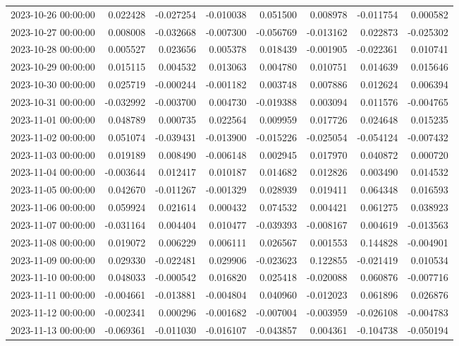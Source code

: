 \begin{tabular}{lrrrrrrr}
2023-10-26 00:00:00 & 0.022428 & -0.027254 & -0.010038 & 0.051500 & 0.008978 & -0.011754 & 0.000582 \\
2023-10-27 00:00:00 & 0.008008 & -0.032668 & -0.007300 & -0.056769 & -0.013162 & 0.022873 & -0.025302 \\
2023-10-28 00:00:00 & 0.005527 & 0.023656 & 0.005378 & 0.018439 & -0.001905 & -0.022361 & 0.010741 \\
2023-10-29 00:00:00 & 0.015115 & 0.004532 & 0.013063 & 0.004780 & 0.010751 & 0.014639 & 0.015646 \\
2023-10-30 00:00:00 & 0.025719 & -0.000244 & -0.001182 & 0.003748 & 0.007886 & 0.012624 & 0.006394 \\
2023-10-31 00:00:00 & -0.032992 & -0.003700 & 0.004730 & -0.019388 & 0.003094 & 0.011576 & -0.004765 \\
2023-11-01 00:00:00 & 0.048789 & 0.000735 & 0.022564 & 0.009959 & 0.017726 & 0.024648 & 0.015235 \\
2023-11-02 00:00:00 & 0.051074 & -0.039431 & -0.013900 & -0.015226 & -0.025054 & -0.054124 & -0.007432 \\
2023-11-03 00:00:00 & 0.019189 & 0.008490 & -0.006148 & 0.002945 & 0.017970 & 0.040872 & 0.000720 \\
2023-11-04 00:00:00 & -0.003644 & 0.012417 & 0.010187 & 0.014682 & 0.012826 & 0.003490 & 0.014532 \\
2023-11-05 00:00:00 & 0.042670 & -0.011267 & -0.001329 & 0.028939 & 0.019411 & 0.064348 & 0.016593 \\
2023-11-06 00:00:00 & 0.059924 & 0.021614 & 0.000432 & 0.074532 & 0.004421 & 0.061275 & 0.038923 \\
2023-11-07 00:00:00 & -0.031164 & 0.004404 & 0.010477 & -0.039393 & -0.008167 & 0.004619 & -0.013563 \\
2023-11-08 00:00:00 & 0.019072 & 0.006229 & 0.006111 & 0.026567 & 0.001553 & 0.144828 & -0.004901 \\
2023-11-09 00:00:00 & 0.029330 & -0.022481 & 0.029906 & -0.023623 & 0.122855 & -0.021419 & 0.010534 \\
2023-11-10 00:00:00 & 0.048033 & -0.000542 & 0.016820 & 0.025418 & -0.020088 & 0.060876 & -0.007716 \\
2023-11-11 00:00:00 & -0.004661 & -0.013881 & -0.004804 & 0.040960 & -0.012023 & 0.061896 & 0.026876 \\
2023-11-12 00:00:00 & -0.002341 & 0.000296 & -0.001682 & -0.007004 & -0.003959 & -0.026108 & -0.004783 \\
2023-11-13 00:00:00 & -0.069361 & -0.011030 & -0.016107 & -0.043857 & 0.004361 & -0.104738 & -0.050194 \\

\end{tabular}

